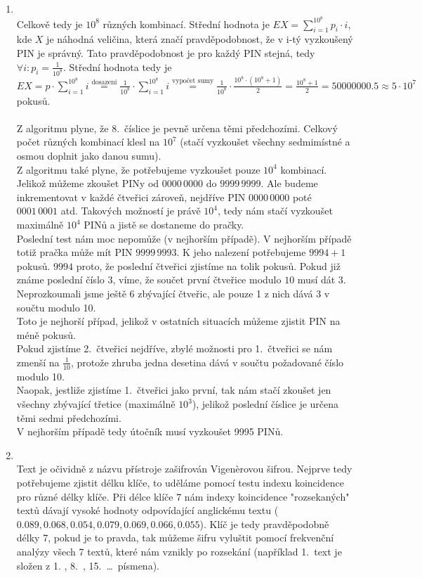 \documentclass[12pt]{article}
\begin{document}
\begin{enumerate}
	
		\item \quad\\
		Celkově tedy je $10^8$ různých kombinací. Střední hodnota je $EX = \sum_{i=1}^{10^8} p_i \cdot i$, kde $X$ je náhodná veličina, která značí pravděpodobnost, že v i-tý vyzkoušený PIN je správný. Tato pravděpodobnost je pro každý PIN stejná, tedy $\forall i : p_i = \frac{1}{10^8} $. Střední hodnota tedy je $EX = p \cdot \sum_{i=1}^{10^8} i \stackrel{\text{dosazení}}{=} \frac{1}{10^8} \cdot \sum_{i=1}^{10^8} i \stackrel{\text{vypočet sumy}}{=} \frac{1}{10^8} \cdot \frac{10^8 \cdot (10^8 +1)}{2} = \frac{10^8+1}{2} = 50000000.5 \approx 5 \cdot 10^7$  pokusů.\\\\
		Z algoritmu plyne, že 8.\ číslice je pevně určena těmi předchozími. Celkový počet různých kombinací klesl na $10^7$ (stačí vyzkoušet všechny sedmimístné a osmou doplnit jako danou sumu).\\
		Z algoritmu také plyne, že potřebujeme vyzkoušet pouze $10^4$ kombinací. Jelikož můžeme zkoušet PINy od $0000\,0000$ do $9999\,9999$. Ale budeme inkrementovat v každé čtveřici zároveň, nejdříve PIN $0000\,0000$ poté $0001\,0001$ atd. Takových možností je právě $10^4$, tedy nám stačí vyzkoušet maximálně $10^4$ PINů a jistě se dostaneme do pračky.\\
		Poslední test nám moc nepomůže (v nejhorším případě). V nejhorším případě totiž  pračka může mít PIN $9999\,9993$. K jeho nalezení potřebujeme $9994 + 1$ pokusů. $9994$ proto, že poslední čtveřici zjistíme na tolik pokusů. Pokud již známe poslední číslo $3$, víme, že součet první čtveřice modulo $10$ musí dát 3. Neprozkoumali jsme ještě 6 zbývající čtveřic, ale pouze 1 z nich dává 3 v součtu modulo 10.\\
		Toto je nejhorší případ, jelikož v ostatních situacích můžeme zjistit PIN na méně pokusů.\\
		Pokud zjistíme 2.\ čtveřici nejdříve, zbylé možnosti pro 1.\ čtveřici se nám zmenší na $\frac{1}{10}$, protože zhruba jedna desetina dává v součtu požadované číslo modulo 10.\\
		Naopak, jestliže zjistíme 1.\ čtveřici jako první, tak nám stačí zkoušet jen všechny zbývající třetice (maximálně $10^3$), jelikož poslední číslice je určena těmi sedmi předchozími.\\
		V nejhorším případě tedy útočník musí vyzkoušet 9995 PINů.
		\item \quad\\
		Text je očividně z názvu přístroje zašifrován Vigenèrovou šifrou. Nejprve tedy potřebujeme zjistit délku klíče, to uděláme pomocí testu indexu koincidence pro různé délky klíče. Při délce klíče 7 nám indexy koincidence "rozsekaných" textů dávají vysoké hodnoty odpovídající anglickému textu ($0.089, 0.068, 0.054, 0.079, 0.069, 0.066, 0.055$). Klíč je tedy pravděpodobně délky 7, pokud je to pravda, tak můžeme šifru vyluštit pomocí frekvenční analýzy všech 7 textů, které nám vznikly po rozsekání (například 1.\ text je složen z 1. , 8.\ , 15.\ \dots \, písmena).\\

\end{enumerate}
\end{document}
